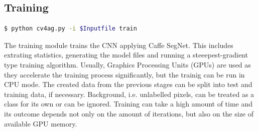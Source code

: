 \documentclass[fleqn,10pt]{SelfArx} %
\begin{document}
\subsection{Training}
\begin{lstlisting}[language=bash]
  $ python cv4ag.py -i $Inputfile train 
\end{lstlisting}
The training module trains the CNN applying Caffe SegNet. This includes extrating statistics, generating the model files and running a steeepest-gradient type training algorithm. Usually, Graphics Processing Units (GPUs) are used as they accelerate the training process significantly, but the trainig can be run in CPU mode. The created data from the previous stages can be split into test and training data, if necessary. Background, i.e. unlabelled pixels, can be treated as a class for its own or can be ignored. Training can take a high amount of time and its outcome depends not only on the amount of iterations, but also on the size of available GPU memory.
\end{document}
